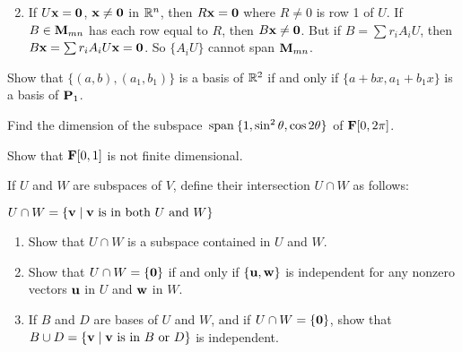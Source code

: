 \begin{multicols}{2}
\begin{ex}
\begin{enumerate}[label={\alph*.}]
\end{enumerate}
\begin{sol}
\begin{enumerate}[label={\alph*.}]
\setcounter{enumi}{1}
\item  If $U\textbf{x} = \textbf{0}$, $\textbf{x} \neq \textbf{0}$ in $\mathbb{R}^n$, then $R\textbf{x} = \textbf{0}$ where $R \neq 0$ is row 1 of $U$. If $B \in \textbf{M}_{mn}$ has each row equal to $R$, then $B\textbf{x} \neq \textbf{0}$. But if $B = \sum r_{i}A_{i}U$, then $B\textbf{x} = \sum  r_{i}A_{i}U\textbf{x} = \textbf{0}$. So $\{A_{i}U\}$ cannot span $\textbf{M}_{mn}$.

\end{enumerate}
\end{sol}
\end{ex}

\begin{ex}
Show that $\{(a, b), (a_{1}, b_{1})\}$ is a basis of $\mathbb{R}^2$ if and only if $\{a + bx, a_{1} + b_{1}x\}$ is a basis of $\textbf{P}_{1}$.
\end{ex}

\begin{ex}
Find the dimension of the subspace $\thinspace\operatorname{span\medspace}\{1, \sin^{2} \theta, \cos 2\theta\}$ of $\textbf{F}[0, 2\pi]$.
\end{ex}

\begin{ex}\label{ex:6_3_32}
Show that $\textbf{F}[0, 1]$ is not finite dimensional.
\end{ex}

\begin{ex}\label{ex:ex6_3_33}
If $U$ and $W$ are subspaces of $V$, define their intersection $U \cap W$ as follows:

$U \cap W = \{\textbf{v} \mid \textbf{v} \mbox{ is in both } U \mbox{ and } W\}$

\begin{enumerate}[label={\alph*.}]
\item Show that $U \cap W$ is a subspace contained in $U$ and $W$.

\item Show that $U \cap W = \{\textbf{0}\}$ if and only if $\{\textbf{u}, \textbf{w}\}$ is independent for any nonzero vectors $\textbf{u}$ in $U$ and $\textbf{w}$ in $W$.

\item If $B$ and $D$ are bases of $U$ and $W$, and if $U \cap W = \{\textbf{0}\}$, show that $B \cup D = \{\textbf{v} \mid \textbf{v} \mbox{ is in } B \mbox{ or } D\}$ is independent.


\end{enumerate}
\end{ex}
\end{multicols}
